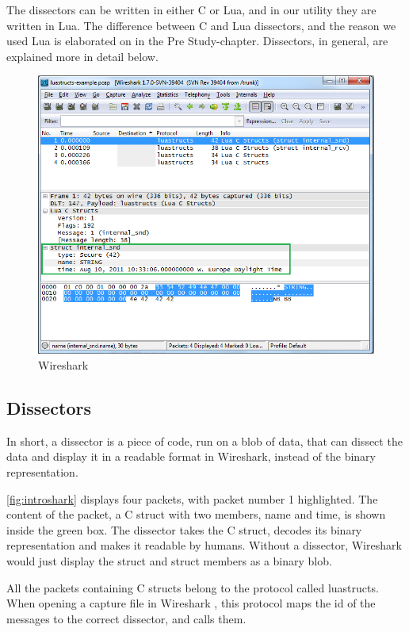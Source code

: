 The dissectors can be written in either C or Lua, and in our utility they are written in Lua.
The difference between C and Lua dissectors, and the reason we used Lua is elaborated on in the Pre Study-chapter.
Dissectors, in general, are explained more in detail below.

\begin{figure}[ht]
	\includegraphics[width=\textwidth]{./img/wireshark_example.png}
	\caption{Wireshark\label{fig:introshark}}
\end{figure}

\subsection*{Dissectors}
In short, a dissector is a piece of code, run on a blob of data, that can dissect the
data and display it in a readable format in Wireshark, instead of the binary representation.

\autoref{fig:introshark} displays four packets, with packet number 1 highlighted.
The content of the packet, a C struct with two members, name and time,  is shown inside the green box.
The dissector takes the C struct, decodes its binary representation and makes it readable by humans.
Without a dissector, Wireshark would just display the struct and struct members as a binary blob.

All the packets containing C structs belong to the protocol called luastructs.
When opening a capture file in Wireshark , this protocol maps the id of the messages to the correct dissector,
and calls them.

